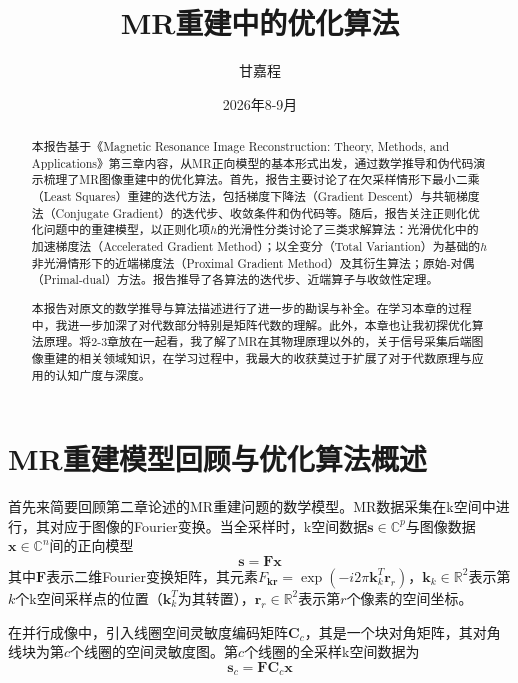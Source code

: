 \documentclass[12pt]{article}
\title{MR重建中的优化算法}
\author{甘嘉程}
\date{2026年8-9月}
\begin{document}
\maketitle

\begin{abstract}
本报告基于《Magnetic Resonance Image Reconstruction: Theory, Methods, and Applications》第三章内容，从MR正向模型的基本形式出发，通过数学推导和伪代码演示梳理了MR图像重建中的优化算法。首先，报告主要讨论了在欠采样情形下最小二乘（Least Squares）重建的迭代方法，包括梯度下降法（Gradient Descent）与共轭梯度法（Conjugate Gradient）的迭代步、收敛条件和伪代码等。随后，报告关注正则化优化问题中的重建模型，以正则化项$h$的光滑性分类讨论了三类求解算法：光滑优化中的加速梯度法（Accelerated Gradient Method）；以全变分（Total Variantion）为基础的$h$非光滑情形下的近端梯度法（Proximal Gradient Method）及其衍生算法；原始-对偶（Primal-dual）方法。报告推导了各算法的迭代步、近端算子与收敛性定理。

本报告对原文的数学推导与算法描述进行了进一步的勘误与补全。在学习本章的过程中，我进一步加深了对代数部分特别是矩阵代数的理解。此外，本章也让我初探优化算法原理。将2-3章放在一起看，我了解了MR在其物理原理以外的，关于信号采集后端图像重建的相关领域知识，在学习过程中，我最大的收获莫过于扩展了对于代数原理与应用的认知广度与深度。
\end{abstract}

\section{MR重建模型回顾与优化算法概述}
首先来简要回顾第二章论述的MR重建问题的数学模型。MR数据采集在k空间中进行，其对应于图像的Fourier变换。当全采样时，k空间数据$\bm{s}\in\mathbb{C}^p$与图像数据$\bm{x}\in\mathbb{C}^n$间的正向模型
\begin{equation}
    \bm{s}=\mathbf{F}\bm{x}
    \label{equ:3.1}
\end{equation}
其中$\mathbf{F}$表示二维Fourier变换矩阵，其元素$F_{\bm{k}\bm{r}}=\exp(-i2\pi\bm{k}_k^T\bm{r}_r)$，$\bm{k}_k\in\mathbb{R}^2$表示第$k$个k空间采样点的位置（$\bm{k}_k^T$为其转置），$\bm{r}_r\in\mathbb{R}^2$表示第$r$个像素的空间坐标。

在并行成像中，引入线圈空间灵敏度编码矩阵$\mathbf{C}_c$，其是一个块对角矩阵，其对角线块为第$c$个线圈的空间灵敏度图。第$c$个线圈的全采样k空间数据为
\begin{equation}
    \bm{s}_c=\mathbf{F}\mathbf{C}_c\bm{x}
    \label{equ:3.2}
\end{equation}
\end{document}
